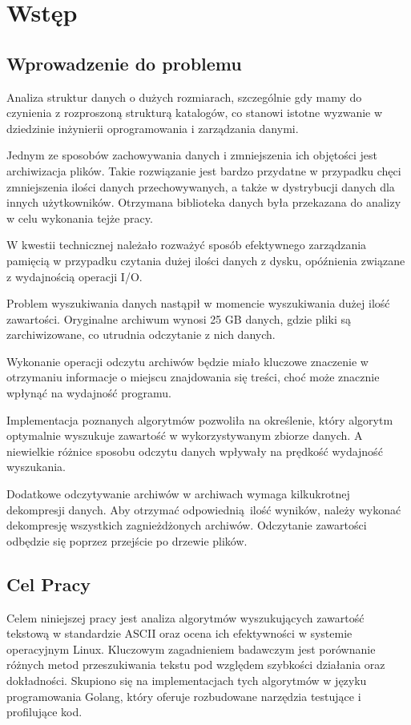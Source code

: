 \chapter{Wstęp}

\section{Wprowadzenie do problemu}
Analiza struktur danych o dużych rozmiarach, szczególnie gdy mamy do czynienia
z rozproszoną strukturą katalogów, co stanowi istotne wyzwanie w dziedzinie 
inżynierii oprogramowania i zarządzania danymi. 

Jednym ze sposobów zachowywania danych i zmniejszenia ich objętości jest 
archiwizacja plików. Takie rozwiązanie jest bardzo przydatne w przypadku chęci
zmniejszenia ilości danych przechowywanych, a także w dystrybucji danych dla
innych użytkowników. Otrzymana biblioteka danych była przekazana do analizy w 
celu wykonania tejże pracy.

W kwestii technicznej należało rozważyć sposób efektywnego zarządzania pamięcią
w przypadku czytania dużej ilości danych z dysku, opóźnienia związane z 
wydajnością operacji I/O.

Problem wyszukiwania danych nastąpił w momencie wyszukiwania dużej ilość 
zawartości. Oryginalne archiwum wynosi 25 GB danych, gdzie pliki są 
zarchiwizowane, co utrudnia odczytanie z nich danych. 

Wykonanie operacji odczytu archiwów będzie miało kluczowe znaczenie w 
otrzymaniu informacje o miejscu znajdowania się treści, choć może znacznie 
wpłynąć na wydajność programu.

Implementacja poznanych algorytmów pozwoliła na określenie, który algorytm 
optymalnie wyszukuje zawartość w wykorzystywanym zbiorze danych. A niewielkie
różnice sposobu odczytu danych wpływały na prędkość wydajność wyszukania.

Dodatkowe odczytywanie archiwów w archiwach wymaga kilkukrotnej dekompresji
danych. Aby otrzymać odpowiednią ilość wyników, należy wykonać dekompresję 
wszystkich zagnieżdżonych archiwów. Odczytanie zawartości odbędzie się poprzez 
przejście po drzewie plików.

\section{Cel Pracy}

Celem niniejszej pracy jest analiza algorytmów wyszukujących zawartość tekstową 
w standardzie ASCII oraz ocena ich efektywności w systemie operacyjnym Linux. 
Kluczowym zagadnieniem badawczym jest porównanie różnych metod przeszukiwania 
tekstu pod względem szybkości działania oraz dokładności. Skupiono się na 
implementacjach tych algorytmów w języku programowania Golang, który oferuje
rozbudowane narzędzia testujące i profilujące kod.

